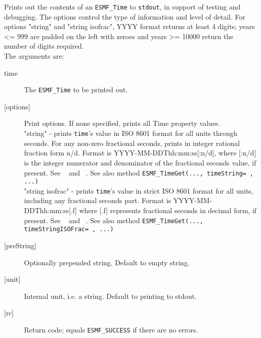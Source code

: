        Prints out the contents of an {\tt ESMF\_Time} to {\tt stdout}, in
       support of testing and debugging.  The options control the type of
       information and level of detail.  For options "string" and "string
       isofrac", YYYY format returns at least 4 digits; years <= 999 are
       padded on the left with zeroes and years >= 10000 return the number
       of digits required. \\
  
       The arguments are:
       \begin{description}
       \item[time]
            The {\tt ESMF\_Time} to be printed out.
       \item[{[options]}]
            Print options. If none specified, prints all Time property values. \\
            "string" - prints {\tt time}'s value in ISO 8601 format for all units
                       through seconds.  For any non-zero fractional seconds,
                       prints in integer rational fraction form n/d.  Format is
                       YYYY-MM-DDThh:mm:ss[:n/d], where [:n/d] is the 
                       integer numerator and denominator of the fractional
                       seconds value, if present.  See ~\cite{ISO} and
                       ~\cite{ISOnotes}.  See also method
                       {\tt ESMF\_TimeGet(..., timeString= , ...)} \\
            "string isofrac" - prints {\tt time}'s value in strict ISO 8601
                       format for all units, including any fractional seconds
                       part.  Format is YYYY-MM-DDThh:mm:ss[.f] where [.f]
                       represents fractional seconds in decimal form, if present.
                       See ~\cite{ISO} and ~\cite{ISOnotes}.  See also method
                       {\tt ESMF\_TimeGet(..., timeStringISOFrac= , ...)} \\
       \item[{[preString]}]
            Optionally prepended string. Default to empty string.
       \item[{[unit]}]
            Internal unit, i.e. a string. Default to printing to stdout.
       \item[{[rc]}]
            Return code; equals {\tt ESMF\_SUCCESS} if there are no errors.
       \end{description}
   
 
